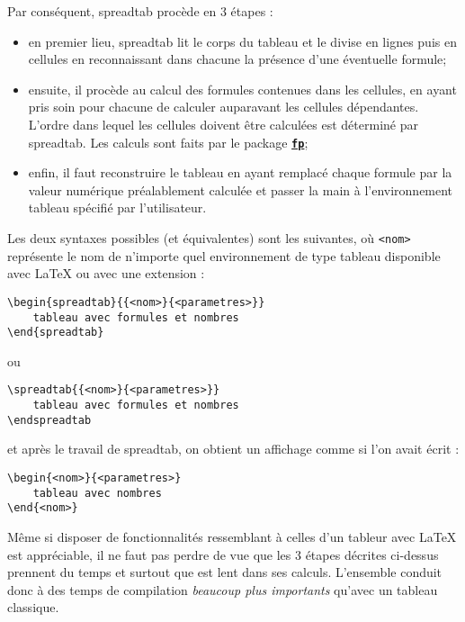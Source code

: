 \documentclass[a4paper,10pt]{article}
\newcommand\ST{\textsf{spreadtab}\xspace}
\newcommand\falseverb[1]{\texttt{\detokenize{#1}}}
\begin{document}
Par conséquent, \ST procède en 3 étapes :
\begin{itemize}
	\item en premier lieu, \ST lit le corps du tableau et le divise en lignes puis en cellules en reconnaissant dans chacune la présence d'une  éventuelle formule;
	\item ensuite, il procède au calcul des formules contenues dans les cellules, en ayant pris soin pour chacune de calculer auparavant les cellules dépendantes. L'ordre dans lequel les cellules doivent être calculées est déterminé par \ST. Les calculs sont faits par le package \href{http://www.ctan.org/tex-archive/macros/latex/contrib/fp/}{\texttt{\textbf{fp}}};
	\item enfin, il faut reconstruire le tableau en ayant remplacé chaque formule par la valeur numérique préalablement calculée et passer la main à l'environnement tableau spécifié par l'utilisateur.
\end{itemize}
Les deux syntaxes possibles (et équivalentes) sont les suivantes, où \verb-<nom>- représente le nom de n'importe quel environnement de type tableau disponible avec \LaTeX{} ou avec une extension :\par\nobreak
\begin{minipage}{0.48\linewidth}
\begin{lstlisting}[backgroundcolor=\color{ST@codebckgcolor}]
\begin{spreadtab}{{<nom>}{<parametres>}}
	tableau avec formules et nombres
\end{spreadtab}
\end{lstlisting}
\end{minipage}\hfill ou\hfill
\begin{minipage}{0.48\linewidth}
\begin{lstlisting}[backgroundcolor=\color{ST@codebckgcolor}]
\spreadtab{{<nom>}{<parametres>}}
	tableau avec formules et nombres
\endspreadtab
\end{lstlisting}
\end{minipage}

et après le travail de \ST, on obtient un affichage comme si l'on avait écrit :\par\nobreak
\begin{lstlisting}[backgroundcolor=\color{ST@codebckgcolor}]
\begin{<nom>}{<parametres>}
	tableau avec nombres
\end{<nom>}
\end{lstlisting}

Même si disposer de fonctionnalités ressemblant à celles d'un tableur avec \LaTeX{} est appréciable, il ne faut pas perdre de vue que les 3 étapes décrites ci-dessus prennent du temps et surtout que \falseverb{fp} est lent dans ses calculs. L'ensemble conduit donc à des temps de compilation \emph{beaucoup plus importants} qu'avec un tableau classique.
\end{document}
